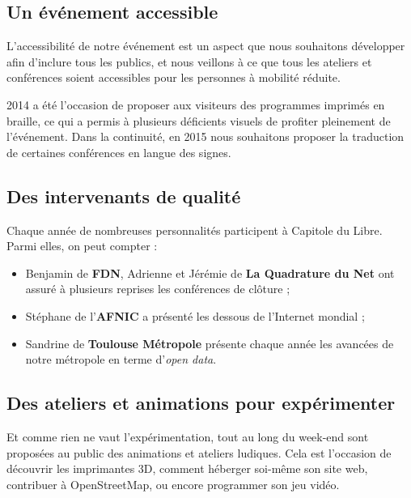 \subsection{Un événement accessible}

\begin{minipage}{0.4\textwidth}
\begin{center}
\end{center}
\end{minipage}
\begin{minipage}{0.6\textwidth}
L'accessibilité de notre événement est un aspect que nous souhaitons
 développer afin d'inclure tous les publics, et nous veillons à ce que
 tous les ateliers et conférences soient accessibles pour les personnes
 à mobilité réduite.

2014 a été l'occasion de proposer aux visiteurs des programmes
 imprimés en braille, ce qui a permis à plusieurs déficients visuels
 de profiter pleinement de l'événement. Dans la continuité, en 2015
 nous souhaitons proposer la traduction de certaines conférences en
 langue des signes.
\end{minipage}

\subsection{Des intervenants de qualité}

Chaque année de nombreuses personnalités participent à Capitole du Libre. Parmi elles, on peut compter :

\begin{itemize}[label=$\bullet$]
\item Benjamin  de \textbf{FDN}, Adrienne  et Jérémie  de \textbf{La Quadrature du Net} ont assuré à plusieurs reprises les conférences de clôture ;
\item Stéphane  de l'\textbf{AFNIC} a présenté les dessous de l'Internet mondial ;
\item Sandrine  de \textbf{Toulouse Métropole} présente chaque année les avancées de notre métropole en terme d'\textit{open data}.
\end{itemize} 

\subsection{Des ateliers et animations pour expérimenter}

\begin{minipage}{0.7\textwidth}
Et comme rien ne vaut l'expérimentation, tout au long du week-end sont 
proposées au public des animations et ateliers ludiques. Cela est 
l'occasion de découvrir les imprimantes 3D, comment héberger soi-même son 
site web, contribuer à OpenStreetMap, ou encore programmer son jeu vidéo.
\end{minipage}
\begin{minipage}{0.3\textwidth}
\end{minipage}

